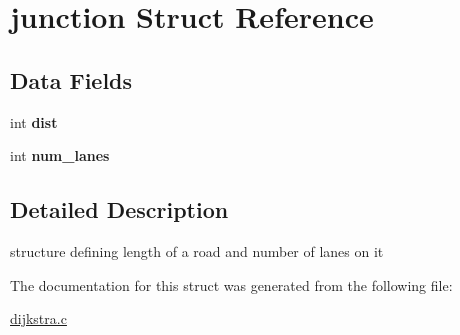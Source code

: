 \hypertarget{structjunction}{
\section{junction Struct Reference}
\label{structjunction}
}
\subsection*{Data Fields}
\begin{DoxyCompactItemize}
\item 
\hypertarget{structjunction_a62d19f1b68cc51e55723b31a29cdef78}{
int {\bfseries dist}}
\label{structjunction_a62d19f1b68cc51e55723b31a29cdef78}

\item 
\hypertarget{structjunction_aeb68c614deded08834f48ef8702a7be8}{
int {\bfseries num\_\-lanes}}
\label{structjunction_aeb68c614deded08834f48ef8702a7be8}

\end{DoxyCompactItemize}


\subsection{Detailed Description}
structure defining length of a road and number of lanes on it 

The documentation for this struct was generated from the following file:\begin{DoxyCompactItemize}
\item 
\hyperlink{dijkstra_8c}{dijkstra.c}\end{DoxyCompactItemize}
